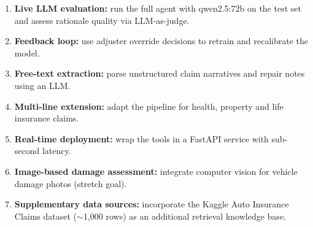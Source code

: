 \documentclass[12pt,a4paper]{article}
\begin{document}
\begin{enumerate}
    \item \textbf{Live LLM evaluation:} run the full agent with qwen2.5:72b on the test set and assess rationale quality via LLM-as-judge.
    \item \textbf{Feedback loop:} use adjuster override decisions to retrain and recalibrate the model.
    \item \textbf{Free-text extraction:} parse unstructured claim narratives and repair notes using an LLM.
    \item \textbf{Multi-line extension:} adapt the pipeline for health, property and life insurance claims.
    \item \textbf{Real-time deployment:} wrap the tools in a FastAPI service with sub-second latency.
    \item \textbf{Image-based damage assessment:} integrate computer vision for vehicle damage photos (stretch goal).
    \item \textbf{Supplementary data sources:} incorporate the Kaggle Auto Insurance Claims dataset ($\sim$1,000 rows) as an additional retrieval knowledge base.
\end{enumerate}
\end{document}
